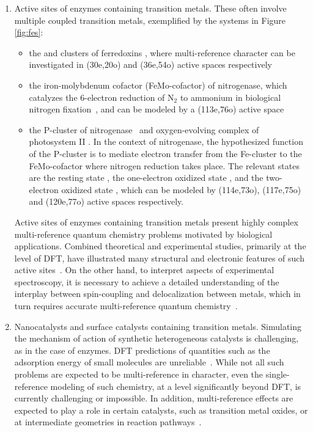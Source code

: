 \begin{enumerate}
\item Active sites of enzymes containing transition metals. These often involve multiple coupled transition metals, exemplified by the systems in Figure \ref{fig:fes}:
\begin{itemize}

\item the  and  clusters of ferredoxins \cite{sharma2014low}, where multi-reference character can be investigated in (30e,20o) and (36e,54o) active spaces respectively \cite{li2008github,li2017spin}

\item the iron-molybdenum cofactor (FeMo-cofactor) of nitrogenase, which catalyzes the 6-electron reduction of N$_2$ to ammonium in biological nitrogen fixation~\cite{noodleman2002insights,reiher2017elucidating}, and can be modeled by a (113e,76o) active space \cite{li2008github,li2019complexity}

\item the P-cluster of nitrogenase~\cite{li2019electronic} and oxygen-evolving complex of photosystem II \cite{cady2008functional,kurashige2013entangled}. In the context of nitrogenase, the hypothesized function of the P-cluster is to mediate electron transfer from the Fe-cluster to the FeMo-cofactor where nitrogen reduction takes place. The relevant states are the resting state , the one-electron oxidized state , and the two-electron oxidized state , which can be modeled by (114e,73o), (117e,75o) and (120e,77o) active spaces respectively.
\end{itemize}
Active sites of enzymes containing transition metals present highly complex multi-reference quantum chemistry problems motivated by biological applications.
Combined theoretical and experimental studies, primarily at the level of DFT, have illustrated many structural and electronic features of such active sites~\cite{siegbahn2009structures,lancaster2011x,batool2019magnetic}.
On the other hand, to interpret aspects of experimental spectroscopy, it is necessary to achieve a detailed understanding of the interplay between spin-coupling and delocalization between metals, which in turn requires accurate multi-reference quantum chemistry~\cite{sharma2014low,kurashige2013entangled,li2019electronic,chilkuri2019ligand,cao2018protonation}.
%
\item Nanocatalysts and surface catalysts containing transition metals. Simulating the mechanism of action of synthetic heterogeneous catalysts is challenging, as in the case of enzymes.
DFT predictions of quantities such as the adsorption energy of small molecules are unreliable~\cite{schimka2010accurate,capdevila2016performance}. 
While not all such problems are expected to be multi-reference in character, even the single-reference modeling of such chemistry, at a level significantly beyond DFT, is currently challenging or impossible.
In addition, multi-reference effects are expected to play a role in certain catalysts, such as transition metal oxides, or at intermediate geometries in reaction pathways~\cite{norskov2011density,schimka2010accurate,wodtke2016electronically,norskov2009towards}. 
\end{enumerate}

